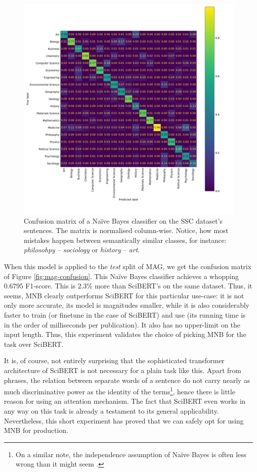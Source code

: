 \begin{figure}
    \centering
    \includegraphics[width=\linewidth]{figures/ss-confusion.png}
    \caption{Confusion matrix of a Naïve Bayes classifier on the SSC dataset's sentences. The matrix is normalised column-wise. Notice, how most mistakes happen between semantically similar classes, for instance:  \textit{philosohpy} -- \textit{sociology} or \textit{history} -- \textit{art}.}
    \label{fig:ss-confusion}
\end{figure}

When this model is applied to the \textit{test} split of MAG, we get the confusion matrix of Figure \ref{fig:mag-confusion}. This Naïve Bayes classifier achieves a whopping $0.6795$ F1-score. This is $2.3\%$ more than SciBERT's on the same dataset. Thus, it seems, MNB clearly outperforms SciBERT for this particular use-case: it is not only more accurate, its model is magnitudes smaller, while it is also considerably faster to train (or finetune in the case of SciBERT) and use (its running time is in the order of milliseconds per publication). It also has no upper-limit on the input length. Thus, this experiment validates the choice of picking MNB for the task over SciBERT.

It is, of course, not entirely surprising that the sophisticated transformer architecture of SciBERT is not necessary for a plain task like this. Apart from phrases, the relation between separate words of a sentence do not carry nearly as much discriminative power as the identity of the terms\footnote{On a similar note, the independence assumption of Naïve Bayes is often less wrong than it might seem \cite{hand2001idiot}.}, hence there is little reason for using an attention mechanism. The fact that SciBERT even works in any way on this task is already a testament to its general applicability. Nevertheless, this short experiment has proved that we can safely opt for using MNB for production.

